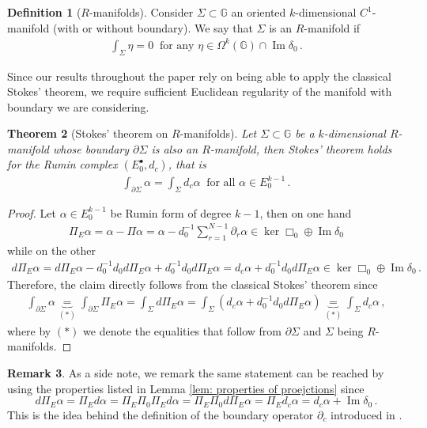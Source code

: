 \documentclass[dvipsnames]{amsart}
\newtheorem{theorem}{Theorem}[section]
\theoremstyle{definition}
\newtheorem{definition}[theorem]{Definition}
\newtheorem{remark}[theorem]{Remark}
\theoremstyle{definition}
\numberwithin{equation}{section}
\newcommand{\G}{\mathbb{G}}
\begin{document}
\begin{definition}[$R$-manifolds]\label{def: R manifolds}
    Consider $\Sigma\subset\mathbb{G}$ an oriented $k$-dimensional $C^1$-manifold (with or without boundary). We say that $\Sigma$ is an $R$-manifold if 
    \begin{align*}
        \int_\Sigma\eta=0\ \text{ for any }\eta\in\Omega^k(\G)\cap\operatorname{Im}\delta_0\,.
    \end{align*}
\end{definition}
Since our results throughout the paper rely on being able to apply the classical Stokes' theorem, we require sufficient Euclidean regularity of the manifold with boundary we are considering.
\begin{theorem}[Stokes' theorem on $R$-manifolds]\label{thm: stokes on R manifolds}
    Let $\Sigma\subset\G$ be a $k$-dimensional $R$-manifold whose boundary $\partial\Sigma$ is also an $R$-manifold, then Stokes' theorem holds for the Rumin complex $(E_0^\bullet,d_c)$, that is
    \begin{align*}
        \int_{\partial\Sigma}\alpha=\int_\Sigma d_c\alpha\ \text{ for all }\alpha\in E_0^{k-1}\,.
    \end{align*}
\end{theorem}
\begin{proof}
    Let $\alpha\in E_0^{k-1}$ be Rumin form of degree $k-1$, then on one hand
    \begin{align*}
        \Pi_E\alpha=\alpha-\Pi\alpha=\alpha-d_0^{-1}\sum_{r=1}^{N-1}\partial_r\alpha\in\ker\Box_0\oplus\operatorname{Im}\delta_0
    \end{align*}
    while on the other
    \begin{align*}
        d\Pi_E\alpha=d\Pi_E\alpha-d_0^{-1}d_0d\Pi_E\alpha+d_0^{-1}d_0d\Pi_E\alpha=d_c\alpha+d_0^{-1}d_0d\Pi_E\alpha\in\ker\Box_0\oplus\operatorname{Im}\delta_0\,.
    \end{align*}
    Therefore, the claim directly follows from the classical Stokes' theorem since
    \begin{align*}
        \int_{\partial\Sigma}\alpha\underbrace{=}_{(\ast)}\int_{\partial\Sigma}\Pi_E\alpha=\int_{\Sigma}d\Pi_E\alpha=\int_{\Sigma}\left(d_c\alpha+d_0^{-1}d_0d\Pi_E\alpha\right)\underbrace{=}_{(\ast)}\int_{\Sigma}d_c\alpha\,,
    \end{align*}
    where by $(\ast)$ we denote the equalities that follow from $\partial\Sigma$ and $\Sigma$ being $R$-manifolds.
\end{proof}
\begin{remark}
    As a side note, we remark the same statement can be reached by using the properties listed in Lemma \ref{lem: properties of proejctions} since $$d\Pi_E\alpha=\Pi_E d\alpha=\Pi_E\Pi_0\Pi_Ed\alpha=\Pi_E\Pi_0d\Pi_E\alpha=\Pi_E d_c\alpha=d_c\alpha+\operatorname{Im}\delta_0\,.$$
    This is the idea behind the definition of the boundary operator $\partial_c$ introduced in \cite{julia2023flat}.
\end{remark}
\end{document}
